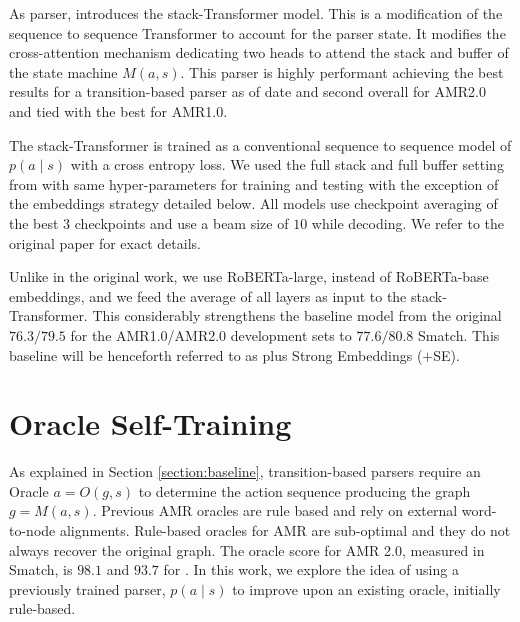 \documentclass[11pt,a4paper]{article}
\begin{document}
As parser, \cite{anon2020a} introduces the stack-Transformer model. This is a modification of the sequence to sequence Transformer \cite{vaswani2017attention} to account for the parser state. It modifies the cross-attention mechanism dedicating two heads to attend the stack and buffer of the state machine $M(a, s)$. This parser is highly performant achieving the best results for a transition-based parser as of date and second overall for AMR2.0 and tied with the best for AMR1.0.

The stack-Transformer is trained as a conventional sequence to sequence model of $p(a \mid s)$ with a cross entropy loss. We used the full stack and full buffer setting from \cite{anon2020a} with same hyper-parameters for training and testing with the exception of the embeddings strategy detailed below. All models use checkpoint averaging \cite{junczys-dowmunt-etal-2016-amu} of the best 3 checkpoints and use a beam size of $10$\footnotemark{} while decoding. We refer to the original paper for exact details. 

Unlike in the original work, we use RoBERTa-large, instead of RoBERTa-base embeddings, and we feed the average of all layers as input to the stack-Transformer. This considerably strengthens the baseline model from the original $76.3/79.5$ for the AMR1.0/AMR2.0 development sets to $77.6/80.8$ Smatch\footnotemark{}. This baseline will be henceforth referred to as \cite{anon2020a} plus Strong Embeddings ($+$SE). 
 
\section{Oracle Self-Training}
\label{section:oracle}
As explained in Section \ref{section:baseline}, transition-based parsers require an Oracle $a = O(g, s)$ to determine the action sequence producing the graph $g = M(a, s)$. Previous AMR oracles \cite{ballesteros-al-onaizan-2017-amr,naseem-etal-2019-rewarding,anon2020a} are rule based and rely on external word-to-node alignments. Rule-based oracles for AMR are sub-optimal and they do not always recover the original graph. The oracle score for AMR 2.0, measured in Smatch, is $98.1$ \cite{anon2020a} and $93.7$ for \cite{naseem-etal-2019-rewarding}. In this work, we explore the idea of using a previously trained parser, $p(a \mid s)$ to improve upon an existing oracle, initially rule-based. 
\end{document}

